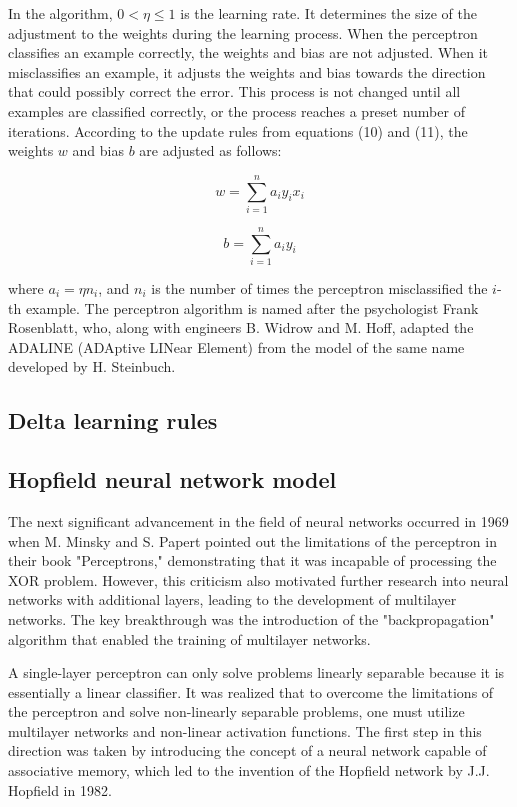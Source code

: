 \documentclass[paper=a4, fontsize=11pt]{scrartcl} %
\numberwithin{equation}{section} %
\numberwithin{figure}{section} %
\numberwithin{table}{section} %
\begin{document}
In the algorithm, \( 0 < \eta \leq 1 \) is the learning rate. It determines the size of the adjustment to the weights during the learning process. When the perceptron classifies an example correctly, the weights and bias are not adjusted. When it misclassifies an example, it adjusts the weights and bias towards the direction that could possibly correct the error. This process is not changed until all examples are classified correctly, or the process reaches a preset number of iterations. According to the update rules from equations (10) and (11), the weights \( w \) and bias \( b \) are adjusted as follows:

\begin{equation}
w = \sum_{i=1}^{n} a_i y_i x_i
\end{equation}

\begin{equation}
b = \sum_{i=1}^{n} a_i y_i
\end{equation}

where \( a_i = \eta n_i \), and \( n_i \) is the number of times the perceptron misclassified the \( i \)-th example. The perceptron algorithm is named after the psychologist Frank Rosenblatt, who, along with engineers B. Widrow and M. Hoff, adapted the ADALINE (ADAptive LINear Element) from the model of the same name developed by H. Steinbuch.

\subsection{Delta learning rules}

\subsection{Hopfield neural network model}
The next significant advancement in the field of neural networks occurred in 1969 when M. Minsky and S. Papert pointed out the limitations of the perceptron in their book "Perceptrons," demonstrating that it was incapable of processing the XOR problem. However, this criticism also motivated further research into neural networks with additional layers, leading to the development of multilayer networks. The key breakthrough was the introduction of the "backpropagation" algorithm that enabled the training of multilayer networks.

A single-layer perceptron can only solve problems linearly separable because it is essentially a linear classifier. It was realized that to overcome the limitations of the perceptron and solve non-linearly separable problems, one must utilize multilayer networks and non-linear activation functions. The first step in this direction was taken by introducing the concept of a neural network capable of associative memory, which led to the invention of the Hopfield network by J.J. Hopfield in 1982.
\end{document}
